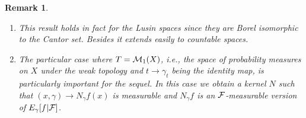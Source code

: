 \documentclass[12pt,a4paper]{book}
\newtheorem{remarkk}[theorem]{Remark}
\newcommand{\ga}{\gamma}
\newcommand{\calF}{{\cal F}}
\newcommand{\calM}{{\cal M}}
\begin{document}
\begin{remarkk}
{\rm{
\begin{enumerate}
\item
This result holds in fact for the Lusin spaces since they are
    Borel isomorphic to the Cantor set. Besides it extends easily to
    countable spaces. 
\item The particular case where $T=\calM_1(X)$, i.e., the space of
  probability measures on $X$ under the weak topology and $t\to \ga_t$
  being the identity map, is particularly
  important for the sequel. In this case we obtain a kernel $N$ such
  that  $(x,\ga)\to N_\ga f(x)$ is measurable and $N_\ga f$ is an
  $\calF$-measurable version of $E_\ga[f|\calF]$. 
\end{enumerate}
}}
\end{remarkk}
\end{document}
